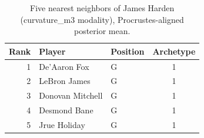 \begin{table}[htbp]
  \centering\small
  \begin{tabular}{rllc}
    \toprule
    Rank & Player & Position & Archetype \\
    \midrule
    1 & De'Aaron Fox & G & 1 \\
    2 & LeBron James & G & 1 \\
    3 & Donovan Mitchell & G & 1 \\
    4 & Desmond Bane & G & 1 \\
    5 & Jrue Holiday & G & 1 \\
    \bottomrule
  \end{tabular}
  \caption{Five nearest neighbors of James Harden (curvature_m3 modality), Procrustes-aligned posterior mean.}
  \label{tab:James_Harden_neighbors_curvature_m3}
\end{table}

